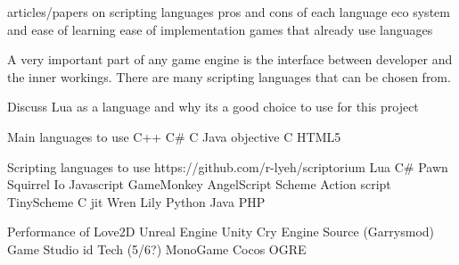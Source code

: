 \documentclass[11pt,a4paper,titlepage]{article}
\begin{document}
		articles/papers on scripting languages
		pros and cons of each language
			eco system and ease of learning
			ease of implementation
		games that already use languages
		
		A very important part of any game engine is the interface between developer and the inner workings. There are many scripting languages that can be chosen from.
		
		
		Discuss Lua as a language and why its a good choice to use for this project
		
		Main languages to use
			C++
			C\#
			C
			Java
			objective C
			HTML5
			
		
		Scripting languages to use https://github.com/r-lyeh/scriptorium
			Lua
			C\# %
			Pawn
			Squirrel
			Io
			Javascript
			GameMonkey
			AngelScript
			Scheme
			Action script
			TinyScheme
			C jit
			Wren
			Lily
			Python
			Java
			PHP
	
		Performance of
			Love2D
			Unreal 
			Engine 
			Unity 
			Cry Engine 
			Source (Garrysmod)
			Game Studio
			id Tech (5/6?)
			MonoGame
			Cocos
			OGRE
						
\end{document}
